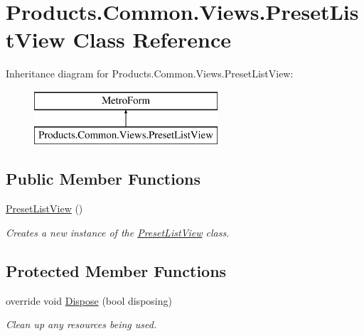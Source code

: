 \hypertarget{class_products_1_1_common_1_1_views_1_1_preset_list_view}{}\section{Products.\+Common.\+Views.\+Preset\+List\+View Class Reference}
\label{class_products_1_1_common_1_1_views_1_1_preset_list_view}
Inheritance diagram for Products.\+Common.\+Views.\+Preset\+List\+View\+:\begin{figure}[H]
\begin{center}
\leavevmode
\includegraphics[height=2.000000cm]{class_products_1_1_common_1_1_views_1_1_preset_list_view}
\end{center}
\end{figure}
\subsection*{Public Member Functions}
\begin{DoxyCompactItemize}
\item 
\hyperlink{class_products_1_1_common_1_1_views_1_1_preset_list_view_ada12032affe10560fb46da09e54a95d4}{Preset\+List\+View} ()
\begin{DoxyCompactList}\small\item\em Creates a new instance of the \hyperlink{class_products_1_1_common_1_1_views_1_1_preset_list_view}{Preset\+List\+View} class. \end{DoxyCompactList}\end{DoxyCompactItemize}
\subsection*{Protected Member Functions}
\begin{DoxyCompactItemize}
\item 
override void \hyperlink{class_products_1_1_common_1_1_views_1_1_preset_list_view_a6177e018ad64e21a51e771ead75b33d8}{Dispose} (bool disposing)
\begin{DoxyCompactList}\small\item\em Clean up any resources being used. \end{DoxyCompactList}\end{DoxyCompactItemize}


